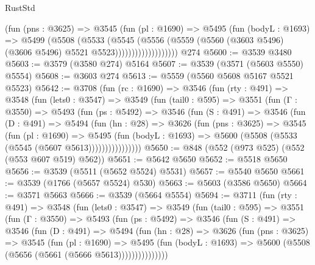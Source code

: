 \begin{lexlean}{RustStd}
\begin{coremodule}
                        (fun (pns : @3625) =>
                        @3545
                          (fun (pl : @1690) =>
                          @5495
                            (fun (bodyL : @1693) =>
                            @5499
                              (@5508
                                (@5533
                                  (@5545
                                    (@5556
                                      (@5559
                                        (@5560
                                          (@3603 @5496)
                                          (@3606 @5496)
                                          @5521
                                          @5523)))))))))))))))))))
    @274
@5600 := @3539 @3480
@5603 := @3579 (@3580 @274) @5164
@5607 := @3539 (@3571 (@5603 @5550) @5554)
@5608 := @3603 @274
@5613 := @5559 (@5560 @5608 @5167 @5521 @5523)
@5642 := @3708
    (fun (rc : @1690) =>
    @3546
      (fun (rty : @491) =>
      @3548
        (fun (lets0 : @3547) =>
        @3549
          (fun (tail0 : @595) =>
          @3551
            (fun (Γ : @3550) =>
            @5493
              (fun (ps : @5492) =>
              @3546
                (fun (S : @491) =>
                @3546
                  (fun (D : @491) =>
                  @5494
                    (fun (hn : @28) =>
                    @3626
                      (fun (pns : @3625) =>
                      @3545
                        (fun (pl : @1690) =>
                        @5495
                          (fun (bodyL : @1693) =>
                          @5600 (@5508 (@5533 (@5545 (@5607 @5613))))))))))))))))
@5650 := @848 (@552 (@973 @525) (@552 (@553 @607 @519) @562))
@5651 := @5642 @5650
@5652 := @5518 @5650
@5656 := @3539 (@5511 (@5652 @5524) @5531)
@5657 := @5540 @5650
@5661 := @3539 (@1766 (@5657 @5524) @530)
@5663 := @5603 (@3586 @5650)
@5664 := @3571 @5663
@5666 := @3539 (@5664 @5554)
@5694 := @3711
    (fun (rty : @491) =>
    @3548
      (fun (lets0 : @3547) =>
      @3549
        (fun (tail0 : @595) =>
        @3551
          (fun (Γ : @3550) =>
          @5493
            (fun (ps : @5492) =>
            @3546
              (fun (S : @491) =>
              @3546
                (fun (D : @491) =>
                @5494
                  (fun (hn : @28) =>
                  @3626
                    (fun (pns : @3625) =>
                    @3545
                      (fun (pl : @1690) =>
                      @5495
                        (fun (bodyL : @1693) =>
                        @5600 (@5508 (@5656 (@5661 (@5666 @5613)))))))))))))))

\end{coremodule}
\end{lexlean}

